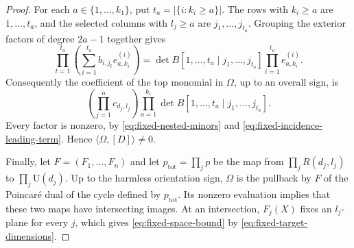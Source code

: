 \begin{proof}
For each $a\in\{1,\ldots,k_1\}$, put
$t_a=|\{i:k_i\geq a\}|$.  The rows with $k_i\geq a$ are
$1,\ldots,t_a$, and the selected columns with $l_j\geq a$ are
$j_1,\ldots,j_{t_a}$.  Grouping the exterior factors of degree $2a-1$
together gives
\[
 \prod_{t=1}^{t_a}
   \left(\sum_{i=1}^{t_a}b_{i,j_t}e_{a,k_i}^{(i)}\right)
 =\det B[1,\ldots,t_a\mid j_1,\ldots,j_{t_a}]
       \prod_{i=1}^{t_a}e_{a,k_i}^{(i)}.
\]
Consequently the coefficient of the top monomial in $\Omega$, up to
an overall sign, is
\begin{equation}\label{eq:fixed-top-coefficient}
 \left(\prod_{j=1}^n c_{d_j,l_j}\right)
 \prod_{a=1}^{k_1}
   \det B[1,\ldots,t_a\mid j_1,\ldots,j_{t_a}].
\end{equation}
Every factor is nonzero, by
\eqref{eq:fixed-nested-minors} and
\eqref{eq:fixed-incidence-leading-term}.  Hence
$\langle\Omega,[D]\rangle\ne0$.

Finally, let $F=(F_1,\ldots,F_n)$ and let
$p_{\mathrm{tot}}=\prod_j p$ be the map from
$\prod_jR(d_j,l_j)$ to $\prod_j\mathrm U(d_j)$.
Up to the harmless orientation sign, $\Omega$ is the pullback by $F$
of the Poincar\'e dual of the cycle defined by $p_{\mathrm{tot}}$.
Its nonzero evaluation implies that these two maps have intersecting
images.  At an intersection, $F_j(X)$ fixes an $l_j$-plane for every
$j$, which gives \eqref{eq:fixed-space-bound} by
\eqref{eq:fixed-target-dimensions}.
\end{proof}
